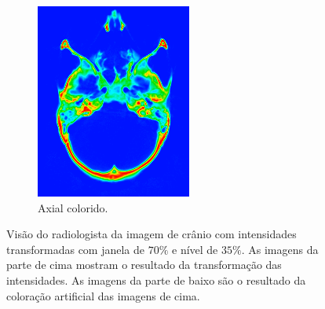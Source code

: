 \documentclass{article}
\begin{document}
\begin{figure}[h]
\begin{subfigure}[b]{0.3\textwidth}
        \includegraphics[width=\textwidth]{skull/radiologist-axial.png}
        \caption{Axial colorido.}
    \end{subfigure}
    \caption{Visão do radiologista da imagem de crânio com intensidades transformadas com janela de $70\%$ e nível de $35\%$. As imagens da parte de cima mostram o resultado da transformação das intensidades. As imagens da parte de baixo são o resultado da coloração artificial das imagens de cima.}
    \label{fig:sull-visao-radiologista-cores}
\end{figure}
\end{document}
